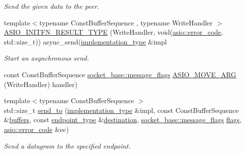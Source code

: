 \begin{DoxyCompactItemize}
\begin{DoxyCompactList}\small\item\em Send the given data to the peer. \end{DoxyCompactList}\item 
{\footnotesize template$<$typename Const\+Buffer\+Sequence , typename Write\+Handler $>$ }\\\hyperlink{classasio_1_1datagram__socket__service_a3bf905f0e8d8bb217f0d83790969d503}{A\+S\+I\+O\+\_\+\+I\+N\+I\+T\+F\+N\+\_\+\+R\+E\+S\+U\+L\+T\+\_\+\+T\+Y\+P\+E} (Write\+Handler, void(\hyperlink{classasio_1_1error__code}{asio\+::error\+\_\+code}, std\+::size\+\_\+t)) async\+\_\+send(\hyperlink{classasio_1_1datagram__socket__service_a41dcdc6b8a3500d6f88e10b6c08925cd}{implementation\+\_\+type} \&impl
\begin{DoxyCompactList}\small\item\em Start an asynchronous send. \end{DoxyCompactList}\item 
const Const\+Buffer\+Sequence \hyperlink{classasio_1_1socket__base_ac3cf77465dfedfe1979b5415cf32cc94}{socket\+\_\+base\+::message\+\_\+flags} \hyperlink{classasio_1_1datagram__socket__service_abb36e047e384fdd85f89ae09a7a76dfc}{A\+S\+I\+O\+\_\+\+M\+O\+V\+E\+\_\+\+A\+R\+G} (Write\+Handler) handler)
\item 
{\footnotesize template$<$typename Const\+Buffer\+Sequence $>$ }\\std\+::size\+\_\+t \hyperlink{classasio_1_1datagram__socket__service_ac7498a1ba1f5bc99059ea5097fdbfe52}{send\+\_\+to} (\hyperlink{classasio_1_1datagram__socket__service_a41dcdc6b8a3500d6f88e10b6c08925cd}{implementation\+\_\+type} \&impl, const Const\+Buffer\+Sequence \&\hyperlink{classasio_1_1datagram__socket__service_a8d5deea235095a9d82c4d36af00eaa0f}{buffers}, const \hyperlink{classasio_1_1datagram__socket__service_a135b71c44f1e92b67cea4402f46578a9}{endpoint\+\_\+type} \&\hyperlink{classasio_1_1datagram__socket__service_ae9f85315015dd493ef24676bbb633eda}{destination}, \hyperlink{classasio_1_1socket__base_ac3cf77465dfedfe1979b5415cf32cc94}{socket\+\_\+base\+::message\+\_\+flags} \hyperlink{classasio_1_1datagram__socket__service_a4bb3745dcca72273467ef14d34819736}{flags}, \hyperlink{classasio_1_1error__code}{asio\+::error\+\_\+code} \&ec)
\begin{DoxyCompactList}\small\item\em Send a datagram to the specified endpoint. \end{DoxyCompactList}\item 

\end{DoxyCompactItemize}
